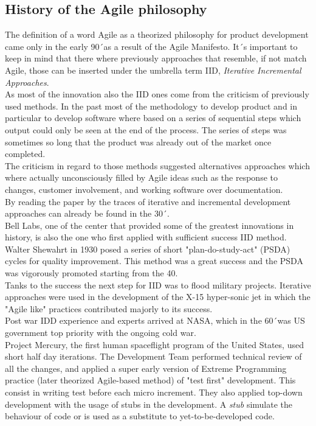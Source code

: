\documentclass[../main.tex]{subfiles}
\begin{document}
\subsection{History of the Agile philosophy}
The definition of a word Agile as a theorized philosophy for product development came only in the early 90´as a result of the Agile Manifesto. It´s important to keep in mind that there where previously approaches that resemble, if not match Agile, those can be inserted under the umbrella term IID, \textit{Iterative Incremental Approaches}.\\
As most of the innovation also the IID ones come from the criticism of previously used methods. In the past most of the methodology to develop product and in particular to develop software where based on a series of sequential steps which output could only be seen at the end of the process. The series of steps was sometimes so long that the product was already out of the market once completed.\\
The criticism in regard to those methods suggested alternatives approaches which where actually unconsciously filled by Agile ideas such as the response to changes, customer involvement, and working software over documentation.\\
By reading the paper by \citet{larman2003iterative} the traces of iterative and incremental development approaches can already be found in the 30´. \\
Bell Labs, one of the center that provided some of the greatest innovations in history, is also the one who first applied with sufficient success IID method. Walter Shewahrt in 1930 posed a series of short "plan-do-study-act" (PSDA) cycles for quality improvement. This method was a great success and the PSDA was vigorously promoted starting from the 40.\\ 
Tanks to the success the next step for IID was to flood military projects. Iterative approaches were used in the development of the X-15 hyper-sonic jet in which the "Agile like" practices contributed majorly to its success.\\ Post war IDD experience and experts arrived at NASA, which in the 60´was US government top priority with the ongoing cold war.\\
Project Mercury, the first human spaceflight program of the United States, used short half day iterations. The Development Team performed technical review of all the changes, and applied a super early version of Extreme Programming practice (later theorized Agile-based method) of "test first" development. This consist in writing test before each micro increment. They also applied top-down development with the usage of stubs in the development. A \textit{stub} simulate the behaviour of code or is used as a substitute to yet-to-be-developed code.\\ 
\end{document}
